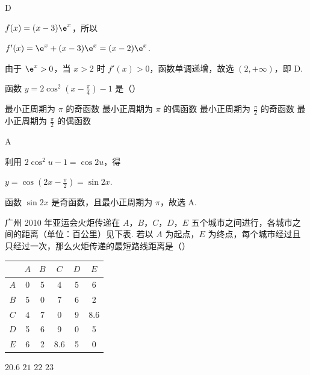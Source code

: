 \begin{answer}
D
\end{answer}

\begin{solution}
\(f(x)=(x-3)\e^x\)，所以

\(f'(x)=\e^x+(x-3)\e^x=(x-2)\e^x\).

由于 \(\e^x>0\)，当 \(x>2\) 时 \(f'(x)>0\)，函数单调递增，故选 \((2,+\infty)\)，即 D.
\end{solution}

\begin{problem}
函数 \( y = 2\cos^2 \left( x - \frac{\pi}{4} \right) - 1 \) 是（\quad）

\choices
    {最小正周期为 \(\pi\) 的奇函数}
    {最小正周期为 \(\pi\) 的偶函数}
    {最小正周期为 \(\frac{\pi}{2}\) 的奇函数}
    {最小正周期为 \(\frac{\pi}{2}\) 的偶函数}
\end{problem}

\begin{answer}
A
\end{answer}

\begin{solution}
利用 \(2\cos^2u-1=\cos2u\)，得

\(y=\cos\left(2x-\frac{\pi}{2}\right)=\sin2x\).

函数 \(\sin2x\) 是奇函数，且最小正周期为 \(\pi\)，故选 A.
\end{solution}

\begin{problem}
广州 2010 年亚运会火炬传递在 \(A\)，\(B\)，\(C\)，\(D\)，\(E\) 五个城市之间进行，各城市之间的距离（单位：百公里）见下表. 若以 \(A\) 为起点，\(E\) 为终点，每个城市经过且只经过一次，那么火炬传递的最短路线距离是（\quad）

\begin{center}
\begin{tabular}{|c|c|c|c|c|c|}
\hline
 & \(A\) & \(B\) & \(C\) & \(D\) & \(E\) \\
\hline
\(A\) & 0 & 5 & 4 & 5 & 6 \\
\hline
\(B\) & 5 & 0 & 7 & 6 & 2 \\
\hline
\(C\) & 4 & 7 & 0 & 9 & 8.6 \\
\hline
\(D\) & 5 & 6 & 9 & 0 & 5 \\
\hline
\(E\) & 6 & 2 & 8.6 & 5 & 0 \\
\hline
\end{tabular}
\end{center}

\choices
    {\(20.6\)}
    {\(21\)}
    {\(22\)}
    {\(23\)}
\end{problem}


